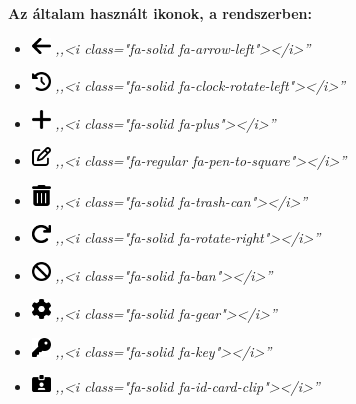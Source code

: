 \documentclass[
]{thesis-ekf}
\theoremstyle{definition}
\theoremstyle{remark}
\begin{document}
	\textbf{Az általam használt ikonok, a rendszerben:}
	\begin{itemize}
		\item \includegraphics[width=0.5cm]{./img/arrow-left-solid}
		 	\emph{,,<i class="fa-solid fa-arrow-left"></i>''}
		
		\item \includegraphics[width=0.5cm]{./img/clock-rotate-left-solid} 
			\emph{,,<i class="fa-solid fa-clock-rotate-left"></i>''}
			
		\item \includegraphics[width=0.5cm]{./img/plus-solid} 
			\emph{,,<i class="fa-solid fa-plus"></i>''}
		
		\item \includegraphics[width=0.5cm]{./img/pen-to-square-regular}
			\emph{,,<i class="fa-regular fa-pen-to-square"></i>''}
			
		\item \includegraphics[width=0.5cm]{./img/trash-can-solid}
			\emph{,,<i class="fa-solid fa-trash-can"></i>''}
			
		\item \includegraphics[width=0.5cm]{./img/arrow-rotate-right-solid}
			\emph{,,<i class="fa-solid fa-rotate-right"></i>''}
		
		\item \includegraphics[width=0.5cm]{./img/ban-solid}
		 	\emph{,,<i class="fa-solid fa-ban"></i>''}
			
		\item \includegraphics[width=0.5cm]{./img/gear-solid}
			\emph{,,<i class="fa-solid fa-gear"></i>''}
			
		\item \includegraphics[width=0.5cm]{./img/key-solid}
			\emph{,,<i class="fa-solid fa-key"></i>''}
			
		\item \includegraphics[width=0.5cm]{./img/id-card-clip-solid}
			\emph{,,<i class="fa-solid fa-id-card-clip"></i>''}
			
	\end{itemize}
\end{document}
